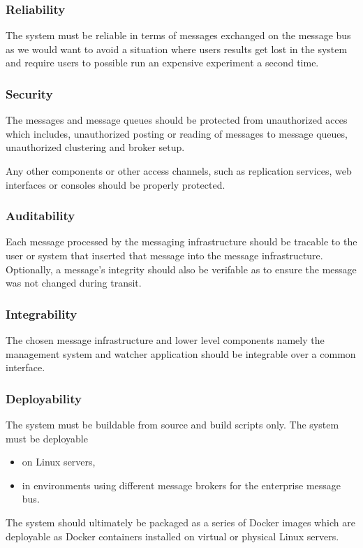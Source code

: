 \subsubsection{Reliability}
The system must be reliable in terms of messages exchanged on the message bus
as we would want to avoid a situation where users results get lost in the
system and require users to possible run an expensive experiment a second
time.

\subsubsection{Security}
The messages and message queues should be protected from unauthorized acces
which includes, unauthorized posting or reading of messages to message queues,
unauthorized clustering and broker setup.

Any other components or other access channels, such as replication services, web
interfaces or consoles should be properly protected.

\subsubsection{Auditability}
Each message processed by the messaging infrastructure should be tracable to
the user or system that inserted that message into the message infrastructure.
Optionally, a message's integrity should also be verifable as to ensure the
message was not changed during transit.

\subsubsection{Integrability}
The chosen message infrastructure and lower level components namely the
management system and watcher application should be integrable over a common
interface.

\subsubsection{Deployability}
The system must be buildable from source and build scripts only.
The system must be deployable
\begin{itemize}
	\item on Linux servers,
	\item in environments using different message brokers for the
	enterprise message bus.
\end{itemize}

The system should ultimately be packaged as a series of Docker images which are
deployable as Docker containers installed on virtual or physical Linux servers.

